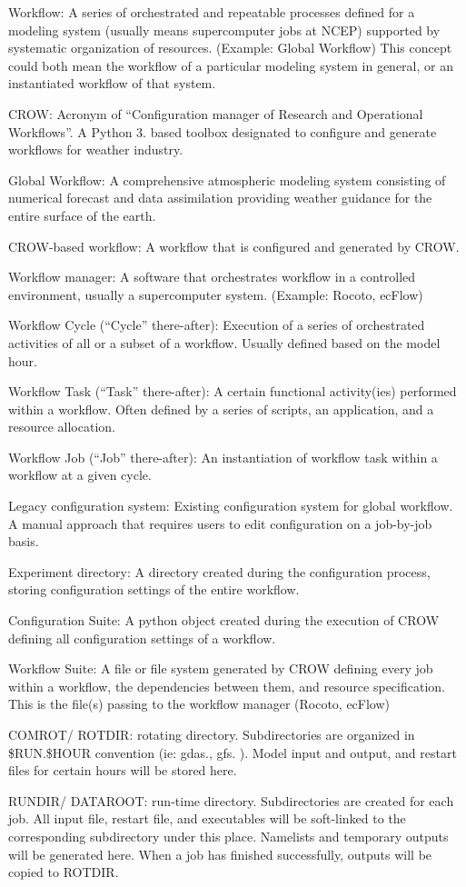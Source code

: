 Workflow\-: A series of orchestrated and repeatable processes defined for a modeling system (usually means supercomputer jobs at N\-C\-E\-P) supported by systematic organization of resources. (Example\-: Global Workflow) This concept could both mean the workflow of a particular modeling system in general, or an instantiated workflow of that system.

C\-R\-O\-W\-: Acronym of “\-Configuration manager of Research and Operational Workflows”. A Python 3. based toolbox designated to configure and generate workflows for weather industry.

Global Workflow\-: A comprehensive atmospheric modeling system consisting of numerical forecast and data assimilation providing weather guidance for the entire surface of the earth.

C\-R\-O\-W-\/based workflow\-: A workflow that is configured and generated by C\-R\-O\-W.

Workflow manager\-: A software that orchestrates workflow in a controlled environment, usually a supercomputer system. (Example\-: Rocoto, ec\-Flow)

Workflow Cycle (“\-Cycle” there-\/after)\-: Execution of a series of orchestrated activities of all or a subset of a workflow. Usually defined based on the model hour.

Workflow Task (“\-Task” there-\/after)\-: A certain functional activity(ies) performed within a workflow. Often defined by a series of scripts, an application, and a resource allocation.

Workflow Job (“\-Job” there-\/after)\-: An instantiation of workflow task within a workflow at a given cycle.

Legacy configuration system\-: Existing configuration system for global workflow. A manual approach that requires users to edit configuration on a job-\/by-\/job basis.

Experiment directory\-: A directory created during the configuration process, storing configuration settings of the entire workflow.

Configuration Suite\-: A python object created during the execution of C\-R\-O\-W defining all configuration settings of a workflow.

Workflow Suite\-: A file or file system generated by C\-R\-O\-W defining every job within a workflow, the dependencies between them, and resource specification. This is the file(s) passing to the workflow manager (Rocoto, ec\-Flow)

C\-O\-M\-R\-O\-T/ R\-O\-T\-D\-I\-R\-: rotating directory. Subdirectories are organized in \$\-R\-U\-N.\$\-H\-O\-U\-R convention (ie\-: gdas., gfs. ). Model input and output, and restart files for certain hours will be stored here.

R\-U\-N\-D\-I\-R/ D\-A\-T\-A\-R\-O\-O\-T\-: run-\/time directory. Subdirectories are created for each job. All input file, restart file, and executables will be soft-\/linked to the corresponding subdirectory under this place. Namelists and temporary outputs will be generated here. When a job has finished successfully, outputs will be copied to R\-O\-T\-D\-I\-R. 